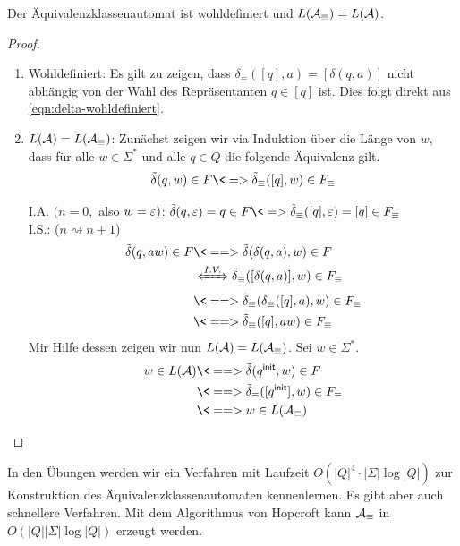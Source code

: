 \begin{Satz}[name={[Äquivalenzklassenautomat ist wohldefiniert]}]
        Der Äquivalenzklassenautomat ist wohldefiniert und $L(\mathcal{A}_\equiv)=L(\mathcal{A})$.
\end{Satz}


\begin{proof}\ 
        \begin{enumerate}
                \item Wohldefiniert: Es gilt zu zeigen, dass $\delta_\equiv([q],a) =[\delta(q,a)]$ nicht abhängig von der Wahl des Repräsentanten $q\in [q]$ ist. Dies folgt direkt aus \autoref{eqn:delta-wohldefiniert}.
                \item $L(\mathcal{A})=L(\mathcal{A}_\equiv)$:
                Zunächst zeigen wir via Induktion über die Länge von $w$, dass für alle $w\in\Sigma^*$ und alle $q\in Q$ die folgende Äquivalenz gilt.
                \[\tilde\delta(q,w)\in F \<=> \tilde\delta_\equiv([q],w)\in F_\equiv\]
                
                
                I.A. $(n=0,$ also $w=\varepsilon)$: $\tilde\delta(q,\Eps)=q\in F \<=> \tilde\delta_\equiv([q],\Eps)=[q]\in F_\equiv$\\
                I.S.: ($n\rightsquigarrow n+1$) \begin{align*}
                \tilde\delta(q,aw)\in F &\<==> \tilde\delta(\delta(q,a),w)\in F\\ &\xLeftrightarrow{I.V.} \tilde\delta_\equiv([\delta(q,a)],w)\in F_\equiv\\
                &\<==> \tilde\delta_\equiv(\delta_\equiv([q],a),w)\in F_\equiv\\
                &\<==> \tilde\delta_\equiv([q],a w)\in F_\equiv
                \end{align*}
                Mir Hilfe dessen zeigen wir nun $L(\mathcal{A})=L(\mathcal{A}_\equiv)$. Sei $w\in\Sigma^*$.
                \begin{align*}
                 w\in L(\A)
                 & \<==> \tilde\delta(\qinit,w) \in F\\
                 & \<==> \tilde\delta_\equiv([\qinit],w) \in F_\equiv\\
                 & \<==> w\in L(\A_\equiv)
                 \qedhere
                \end{align*}
        \end{enumerate}
\end{proof}
In den Übungen werden wir ein Verfahren mit Laufzeit $O(|Q|^4\cdot |\Sigma|\log|Q|)$ zur Konstruktion des Äquivalenzklassenautomaten kennenlernen. Es gibt aber auch schnellere Verfahren. Mit dem Algorithmus von Hopcroft kann $\mathcal{A}_\equiv$ in $O(|Q||\Sigma|\log|Q|)$ erzeugt werden.

